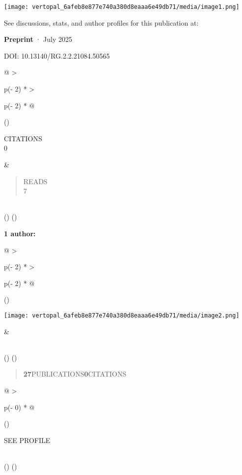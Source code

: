 \documentclass[
]{article}
\author{}
\date{}
\begin{document}
\texttt{[image: vertopal\_6afeb8e877e740a380d8eaaa6e49db71/media/image1.png]}

See discussions, stats, and author profiles for this publication at:

\textbf{Preprint} · July 2025

DOI: 10.13140/RG.2.2.21084.50565

\begin{longtable}[]{@{}
  >{\raggedright\arraybackslash}p{(\columnwidth - 2\tabcolsep) * }
  >{\raggedright\arraybackslash}p{(\columnwidth - 2\tabcolsep) * }@{}}
\toprule()
\begin{minipage}[b]{\linewidth}\raggedright
CITATIONS\\
0\strut
\end{minipage} & \begin{minipage}[b]{\linewidth}\raggedright
\begin{quote}
READS\\
7
\end{quote}\strut
\end{minipage} \\
\midrule()
\endhead
\bottomrule()
\end{longtable}

\textbf{1 author:}

\begin{longtable}[]{@{}
  >{\raggedright\arraybackslash}p{(\columnwidth - 2\tabcolsep) * }
  >{\raggedright\arraybackslash}p{(\columnwidth - 2\tabcolsep) * }@{}}
\toprule()
\begin{minipage}[b]{\linewidth}\raggedright
\texttt{[image: vertopal\_6afeb8e877e740a380d8eaaa6e49db71/media/image2.png]}
\end{minipage} & \begin{minipage}[b]{\linewidth}\raggedright
\end{minipage} \\
\midrule()
\endhead
\bottomrule()
\end{longtable}

\begin{quote}
\textbf{27}PUBLICATIONS\textbf{0}CITATIONS
\end{quote}

\begin{longtable}[]{@{}
  >{\raggedright\arraybackslash}p{(\columnwidth - 0\tabcolsep) * }@{}}
\toprule()
\begin{minipage}[b]{\linewidth}\raggedright
SEE PROFILE
\end{minipage} \\
\midrule()
\endhead
\bottomrule()
\end{longtable}
\end{document}
